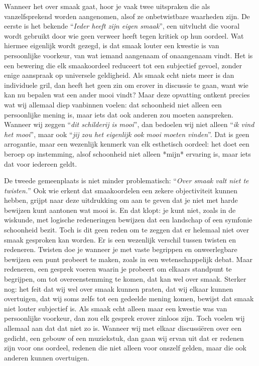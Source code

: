 \begin{mdframed}[leftmargin=0pt,rightmargin=0pt,backgroundcolor=blue!6,linecolor=white,innertopmargin=6pt,innerbottommargin=6pt]

Wanneer het over smaak gaat, hoor je vaak twee uitspraken die als vanzelfsprekend worden aangenomen, alsof ze onbetwistbare waarheden zijn. De eerste is het bekende ``\textit{Ieder heeft zijn eigen smaak}'', een uitvlucht die vooral wordt gebruikt door wie geen verweer heeft tegen kritiek op hun oordeel. Wat hiermee eigenlijk wordt gezegd, is dat smaak louter een kwestie is van persoonlijke voorkeur, van wat iemand aangenaam of onaangenaam vindt. Het is een bewering die elk smaakoordeel reduceert tot een subjectief gevoel, zonder enige aanspraak op universele geldigheid. Als smaak echt niets meer is dan individuele gril, dan heeft het geen zin om erover in discussie te gaan, want wie kan nu bepalen wat een ander mooi vindt? Maar deze opvatting ontkent precies wat wij allemaal diep vanbinnen voelen: dat schoonheid niet alleen een persoonlijke mening is, maar iets dat ook anderen zou moeten aanspreken. Wanneer wij zeggen ``\textit{dit schilderij is mooi}'', dan bedoelen wij niet alleen ``\textit{ik vind het mooi}'', maar ook ``\textit{jij zou het eigenlijk ook mooi moeten vinden}''. Dat is geen arrogantie, maar een wezenlijk kenmerk van elk esthetisch oordeel: het doet een beroep op instemming, alsof schoonheid niet alleen *mijn* ervaring is, maar iets dat voor iedereen geldt.

De tweede gemeenplaats is niet minder problematisch: ``\textit{Over smaak valt niet te twisten.}'' Ook wie erkent dat smaakoordelen een zekere objectiviteit kunnen hebben, grijpt naar deze uitdrukking om aan te geven dat je niet met harde bewijzen kunt aantonen wat mooi is. En dat klopt: je kunt niet, zoals in de wiskunde, met logische redeneringen bewijzen dat een landschap of een symfonie schoonheid bezit. Toch is dit geen reden om te zeggen dat er helemaal niet over smaak gesproken kan worden. Er is een wezenlijk verschil tussen twisten en redeneren. Twisten doe je wanneer je met vaste begrippen en onweerlegbare bewijzen een punt probeert te maken, zoals in een wetenschappelijk debat. Maar redeneren, een gesprek voeren waarin je probeert om elkaars standpunt te begrijpen, om tot overeenstemming te komen, dat kan wel over smaak. Sterker nog: het feit dat wij wel over smaak kunnen praten, dat wij elkaar kunnen overtuigen, dat wij soms zelfs tot een gedeelde mening komen, bewijst dat smaak niet louter subjectief is. Als smaak echt alleen maar een kwestie was van persoonlijke voorkeur, dan zou elk gesprek erover zinloos zijn. Toch voelen wij allemaal aan dat dat niet zo is. Wanneer wij met elkaar discussiëren over een gedicht, een gebouw of een muziekstuk, dan gaan wij ervan uit dat er redenen zijn voor ons oordeel, redenen die niet alleen voor onszelf gelden, maar die ook anderen kunnen overtuigen.


\end{mdframed}
